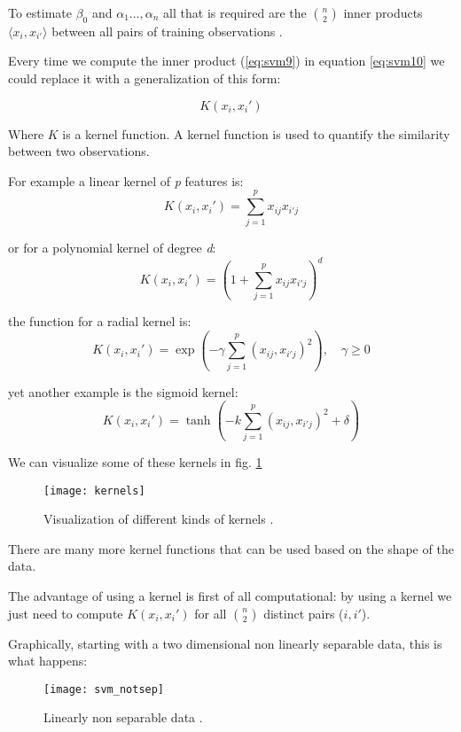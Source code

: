 To estimate $\beta_{0}$ and $\alpha_1 \dots, \alpha_n$ all that is required are the $n \choose 2$ inner products $\langle x_i, x_{i'} \rangle$ between all pairs of training observations \cite{ISLR}.

Every time we compute the inner product (\ref{eq:svm9}) in equation \ref{eq:svm10} we could replace it with a generalization of this form:

\begin{equation} \label{eq:svm11}
K(x_i, x_i')
\end{equation}

Where $K$ is a kernel function. A kernel function is used to quantify the similarity between two observations. 

For example a linear kernel of \textit{p} features is:
\begin{equation} \label{eq:svm12}
	K(x_i, x_i') = \sum_{j=1}^{p} x_{ij}x_{i'j}
\end{equation}

or for a polynomial kernel of degree \textit{d}:
\begin{equation} \label{eq:svm13}
	K(x_i, x_i') = (1 + \sum_{j=1}^{p} x_{ij}x_{i'j})^d
\end{equation}

the function for a radial kernel is:
\begin{equation} \label{eq:svm14}
	K(x_i, x_i') = \exp(-\gamma\sum_{j=1}^{p} (x_{ij}, x_{i'j})^2), \quad \gamma \ge 0
\end{equation} 

yet another example is the sigmoid kernel:
\begin{equation} \label{eq:svm15}
	K(x_i, x_i') = \tanh(-k\sum_{j=1}^{p} (x_{ij}, x_{i'j})^2 + \delta)
\end{equation}

We can visualize some of these kernels in fig. \ref{fig:kernels}
\begin{figure}[H]
	\centering
	\texttt{[image: kernels]}
	\caption{Visualization of different kinds of kernels \cite{kernels}.}
	\label{fig:kernels}
\end{figure} 

There are many more kernel functions that can be used based on the shape of the data.

The advantage of using a kernel is first of all computational: by using a kernel we just need to compute $K(x_i, x_i')$ for all $n \choose 2$ distinct pairs ($i, i'$).

Graphically, starting with a two dimensional non linearly separable data, this is what happens:
\begin{figure}[H]
	\centering
	\texttt{[image: svm\_notsep]}
	\caption{Linearly non separable data \cite{kernel_trick}.}
\end{figure} 

